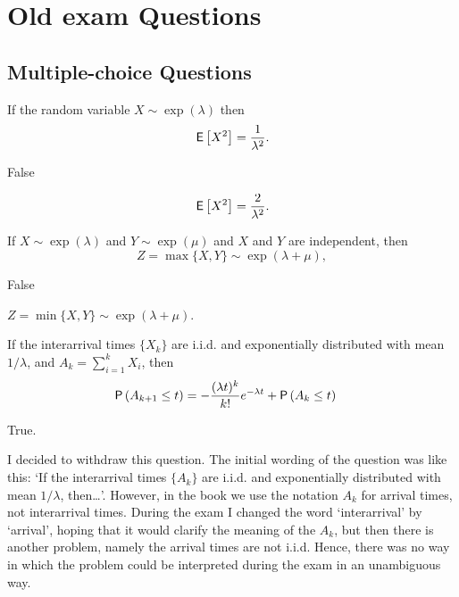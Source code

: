 \section{Old exam Questions}

\subsection{Multiple-choice Questions}

\begin{exercise}[201703] 
  If the random variable $X\sim\exp(\lambda)$ then
  \begin{equation*}
  \,\mathsf{E}\left[X^2\right]= \frac{1}{\lambda^2}.
  \end{equation*}
\begin{solution}
    False

  \begin{equation*}
  \,\mathsf{E}\left[X^2\right]= \frac{2}{\lambda^2}.
  \end{equation*}

\end{solution}
\end{exercise}

\begin{exercise}[201703]
  If $X\sim\exp(\lambda)$ and $Y\sim\exp(\mu)$ and $X$ and $Y$ are
  independent, then
  \begin{equation*}
Z=\max\{X,Y\}\sim\exp(\lambda+\mu),
  \end{equation*}
\begin{solution}
    False

$Z=\min\{X,Y\} \sim \exp(\lambda+\mu)$.

\end{solution}
\end{exercise}

\begin{exercise}[201703]
  If the interarrival times $\{X_k\}$ are i.i.d. and exponentially
  distributed with mean $1/\lambda$, and $A_k = \sum_{i=1}^k X_i$, then 
\begin{equation*}
  \begin{split}
\P{A_{k+1} \leq t} 
&= - \frac{(\lambda t)^{k}}{k!} e^{-\lambda t} + \P{A_k \leq t}
  \end{split}
\end{equation*}
\begin{solution}
    True. 

    I decided to withdraw this question. The initial wording of the
    question was like this: `If the interarrival times $\{A_k\}$ are
    i.i.d. and exponentially distributed with mean $1/\lambda$,
    then\ldots'. However, in the book we use the notation $A_k$ for
    arrival times, not interarrival times. During the exam I changed
    the word `interarrival' by `arrival', hoping that it would clarify
    the meaning of the $A_k$, but then there is another problem,
    namely the arrival times are not i.i.d.  Hence, there was no way
    in which the problem could be interpreted during the exam in an
    unambiguous way. 
\end{solution}
\end{exercise}

